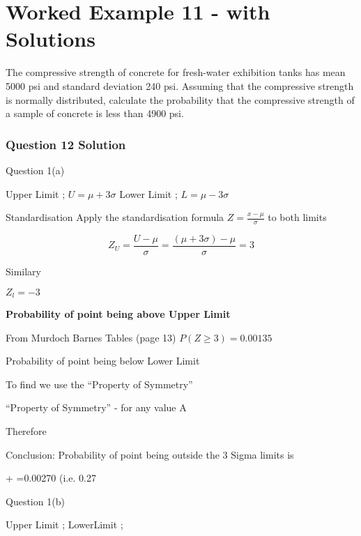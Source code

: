 
\section{Worked Example 11 - with Solutions}
The compressive strength of concrete for fresh-water exhibition tanks has mean 5000 psi and standard deviation 240 psi. Assuming that the compressive strength is normally distributed, calculate the probability that the compressive strength of a sample of concrete is less than 4900 psi.




	

\subsubsection{Question 12 Solution}

Question 1(a)

Upper Limit ;  $U = \mu + 3 \sigma $
Lower Limit ;  $L = \mu - 3 \sigma $

Standardisation
Apply the standardisation formula	$Z=\frac{x-\mu}{\sigma} $	to both limits

\[ Z_U = \frac{U-\mu}{\sigma} =  \frac{(\mu + 3 \sigma)-\mu}{\sigma} = 3\]

Similary

$Z_l=-3$ 

\noindent \textbf{Probability of point being above Upper Limit}

From Murdoch Barnes Tables (page 13)  $P(Z \geq 3)=0.00135$

Probability of point being below Lower Limit


To find   we use the “Property of Symmetry”

“Property of Symmetry” -   for any value A

Therefore 

Conclusion: 
Probability of point being outside the 3 Sigma limits is

+ =0.00270 	(i.e. 0.27%
















Question 1(b)

Upper Limit ;  
LowerLimit ;  

